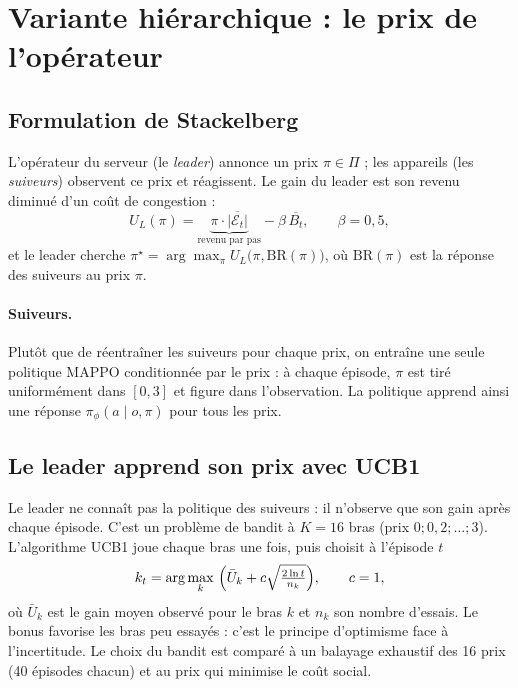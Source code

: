 \documentclass[11pt,a4paper]{article}
\begin{document}
\section{Variante hiérarchique : le prix de l'opérateur}

\subsection{Formulation de Stackelberg}

L'opérateur du serveur (le \emph{leader}) annonce un prix $\pi\in\Pi$ ; les appareils (les \emph{suiveurs})
observent ce prix et réagissent. Le gain du leader est son revenu diminué d'un coût de congestion :
\begin{equation}
  U_L(\pi) = \underbrace{\pi\cdot\overline{|\mathcal{E}_t|}}_{\text{revenu par pas}} - \beta\,\overline{B_t},
  \qquad \beta=0{,}5,
\end{equation}
et le leader cherche $\pi^\star=\arg\max_{\pi} U_L\bigl(\pi,\mathrm{BR}(\pi)\bigr)$, où $\mathrm{BR}(\pi)$ est
la réponse des suiveurs au prix $\pi$.

\paragraph{Suiveurs.} Plutôt que de réentraîner les suiveurs pour chaque prix, on entraîne une seule politique
MAPPO conditionnée par le prix : à chaque épisode, $\pi$ est tiré uniformément dans $[0,3]$ et figure dans
l'observation. La politique apprend ainsi une réponse $\pi_\phi(a\mid o,\pi)$ pour tous les prix.

\subsection{Le leader apprend son prix avec UCB1}

Le leader ne connaît pas la politique des suiveurs : il n'observe que son gain après chaque épisode. C'est un
problème de bandit à $K=16$ bras (prix $0;0{,}2;\dots;3$). L'algorithme UCB1 joue chaque bras une fois, puis
choisit à l'épisode $t$
\begin{equation}
  k_t = \arg\max_k\ \Bigl(\bar U_k + c\sqrt{\tfrac{2\ln t}{n_k}}\Bigr),\qquad c=1,
\end{equation}
où $\bar U_k$ est le gain moyen observé pour le bras $k$ et $n_k$ son nombre d'essais. Le bonus favorise les bras
peu essayés : c'est le principe d'optimisme face à l'incertitude. Le choix du bandit est comparé à un balayage
exhaustif des 16 prix (40 épisodes chacun) et au prix qui minimise le coût social.
\end{document}
